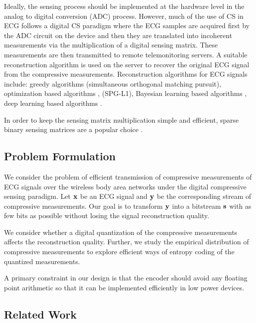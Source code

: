 Ideally, the sensing process should be implemented at the
hardware level in the analog to digital conversion (ADC) process.
However, much of the use of CS in ECG follows
a digital CS paradigm \cite{mamaghanian2011compressed} where
the ECG samples are acquired first by the ADC circuit on the
device and then they are translated into incoherent
measurements via the multiplication of a digital sensing matrix.
These measurements are then transmitted
to remote telemonitoring servers. A suitable reconstruction
algorithm is used on the server to recover the original
ECG signal from the compressive measurements.
Reconstruction algorithms for ECG signals include:
greedy algorithms 
\cite{polania2011compressed} (simultaneous orthogonal matching pursuit),
optimization based algorithms \cite{zhang2014energy},
\cite{mamaghanian2011compressed} (SPG-L1),
Bayesian learning based algorithms
\cite{zhang2012compressed,zhang2014spatiotemporal,zhang2013extension},
deep learning based algorithms \cite{zhang2021csnet}.

In order to keep the sensing matrix multiplication
simple and efficient, sparse binary sensing matrices
are a popular choice \cite{mamaghanian2011compressed,zhang2012compressed}.

\subsection{Problem Formulation}

We consider the problem of efficient transmission of
compressive measurements of ECG signals over the wireless body
area networks under the digital compressive sensing paradigm.
Let $\mathbf{x}$ be an ECG signal and $\mathbf{y}$ be the corresponding
stream of compressive measurements. Our goal is to
transform $\mathbf{y}$ into a bitstream $\mathbf{s}$ with as few bits
as possible without losing the signal reconstruction quality.

We consider whether a digital quantization of the compressive
measurements affects the reconstruction quality.
Further, we study the empirical distribution of compressive
measurements to explore efficient ways of entropy coding
of the quantized measurements.

A primary constraint in our design is that the encoder
should avoid any floating point arithmetic so that it
can be implemented efficiently in low power devices.


\subsection{Related Work}

